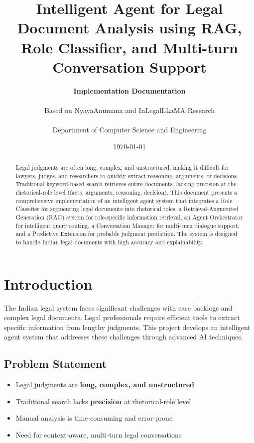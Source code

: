 \documentclass[12pt,a4paper]{article}
\title{\Large\textbf{Intelligent Agent for Legal Document Analysis using RAG, Role Classifier, and Multi-turn Conversation Support}}
\author{
    \textbf{Implementation Documentation}\\
    \\
    Based on NyayaAnumana and InLegalLLaMA Research\\
    \\
    \small Department of Computer Science and Engineering
}
\date{\today}
\begin{document}
\maketitle

\begin{abstract}
Legal judgments are often long, complex, and unstructured, making it difficult for lawyers, judges, and researchers to quickly extract reasoning, arguments, or decisions. Traditional keyword-based search retrieves entire documents, lacking precision at the rhetorical-role level (facts, arguments, reasoning, decision). This document presents a comprehensive implementation of an intelligent agent system that integrates a Role Classifier for segmenting legal documents into rhetorical roles, a Retrieval-Augmented Generation (RAG) system for role-specific information retrieval, an Agent Orchestrator for intelligent query routing, a Conversation Manager for multi-turn dialogue support, and a Predictive Extension for probable judgment prediction. The system is designed to handle Indian legal documents with high accuracy and explainability.
\end{abstract}

\tableofcontents
\newpage

\section{Introduction}

The Indian legal system faces significant challenges with case backlogs and complex legal documents. Legal professionals require efficient tools to extract specific information from lengthy judgments. This project develops an intelligent agent system that addresses these challenges through advanced AI techniques.

\subsection{Problem Statement}

\begin{itemize}
    \item Legal judgments are \textbf{long, complex, and unstructured}
    \item Traditional search lacks \textbf{precision} at rhetorical-role level
    \item Manual analysis is time-consuming and error-prone
    \item Need for context-aware, multi-turn legal conversations
\end{itemize}
\end{document}
